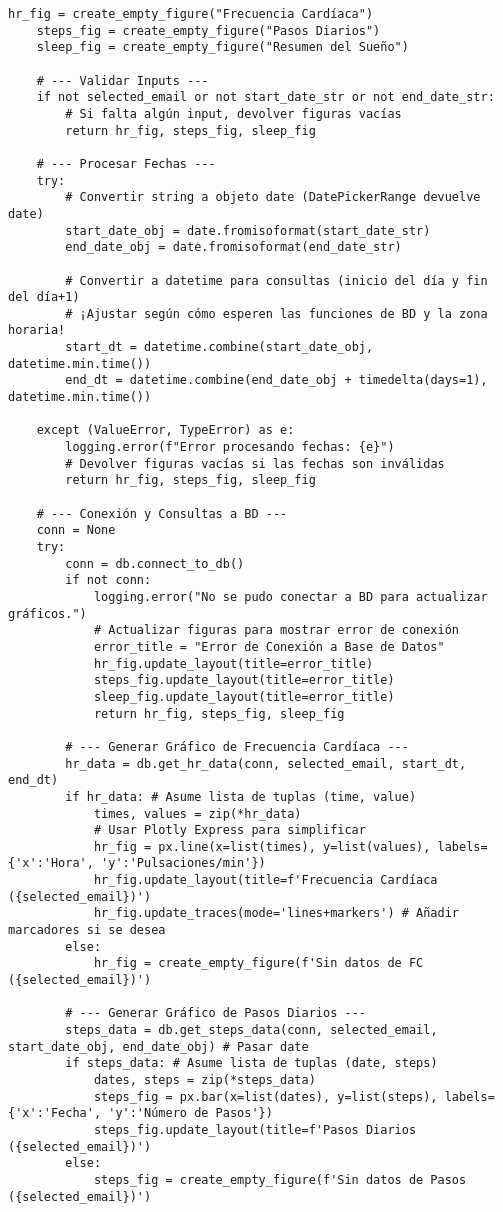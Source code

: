 \begin{lstlisting}[caption={Ejemplo de callback principal en Dash para actualizar gráficos.}, label={lst:dash_callback_code}]
    hr_fig = create_empty_figure("Frecuencia Cardíaca")
    steps_fig = create_empty_figure("Pasos Diarios")
    sleep_fig = create_empty_figure("Resumen del Sueño")

    # --- Validar Inputs ---
    if not selected_email or not start_date_str or not end_date_str:
        # Si falta algún input, devolver figuras vacías
        return hr_fig, steps_fig, sleep_fig

    # --- Procesar Fechas ---
    try:
        # Convertir string a objeto date (DatePickerRange devuelve date)
        start_date_obj = date.fromisoformat(start_date_str)
        end_date_obj = date.fromisoformat(end_date_str)

        # Convertir a datetime para consultas (inicio del día y fin del día+1)
        # ¡Ajustar según cómo esperen las funciones de BD y la zona horaria!
        start_dt = datetime.combine(start_date_obj, datetime.min.time())
        end_dt = datetime.combine(end_date_obj + timedelta(days=1), datetime.min.time())

    except (ValueError, TypeError) as e:
        logging.error(f"Error procesando fechas: {e}")
        # Devolver figuras vacías si las fechas son inválidas
        return hr_fig, steps_fig, sleep_fig

    # --- Conexión y Consultas a BD ---
    conn = None
    try:
        conn = db.connect_to_db()
        if not conn:
            logging.error("No se pudo conectar a BD para actualizar gráficos.")
            # Actualizar figuras para mostrar error de conexión
            error_title = "Error de Conexión a Base de Datos"
            hr_fig.update_layout(title=error_title)
            steps_fig.update_layout(title=error_title)
            sleep_fig.update_layout(title=error_title)
            return hr_fig, steps_fig, sleep_fig

        # --- Generar Gráfico de Frecuencia Cardíaca ---
        hr_data = db.get_hr_data(conn, selected_email, start_dt, end_dt)
        if hr_data: # Asume lista de tuplas (time, value)
            times, values = zip(*hr_data)
            # Usar Plotly Express para simplificar
            hr_fig = px.line(x=list(times), y=list(values), labels={'x':'Hora', 'y':'Pulsaciones/min'})
            hr_fig.update_layout(title=f'Frecuencia Cardíaca ({selected_email})')
            hr_fig.update_traces(mode='lines+markers') # Añadir marcadores si se desea
        else:
            hr_fig = create_empty_figure(f'Sin datos de FC ({selected_email})')

        # --- Generar Gráfico de Pasos Diarios ---
        steps_data = db.get_steps_data(conn, selected_email, start_date_obj, end_date_obj) # Pasar date
        if steps_data: # Asume lista de tuplas (date, steps)
            dates, steps = zip(*steps_data)
            steps_fig = px.bar(x=list(dates), y=list(steps), labels={'x':'Fecha', 'y':'Número de Pasos'})
            steps_fig.update_layout(title=f'Pasos Diarios ({selected_email})')
        else:
            steps_fig = create_empty_figure(f'Sin datos de Pasos ({selected_email})')


\end{lstlisting}
